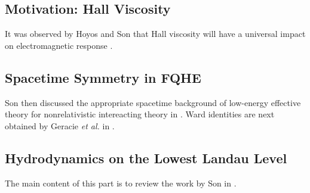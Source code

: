 \documentclass[10pt,nofootinbib,letterpaper]{revtex4}
\begin{document}
	\subsection{Motivation: Hall Viscosity}
		It was observed by Hoyos and Son that Hall viscosity will have a universal impact on electromagnetic response \cite{hoyos2012hall}.
	\subsection{Spacetime Symmetry in FQHE}
		Son then discussed the appropriate spacetime background of low-energy effective theory for nonrelativistic intereacting theory in \cite{son2013newton}. Ward identities are next obtained by Geracie {\it et al.} in \cite{geracie2015spacetime}.

	\subsection{Hydrodynamics on the Lowest Landau Level}
		The main content of this part is to review the work by Son in \cite{geracie2015hydrodynamics}.


\end{document}
